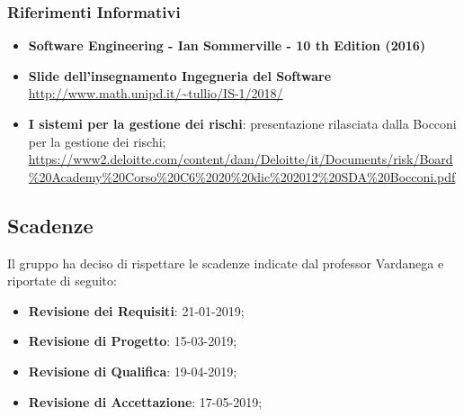 		\subsubsection{Riferimenti Informativi}
			\begin{itemize}
				\item \textbf{Software Engineering - Ian Sommerville - 10 th Edition (2016)}
				\item \textbf{Slide dell’insegnamento Ingegneria del Software}\\
				\url{http://www.math.unipd.it/~tullio/IS-1/2018/}
				\item \textbf{I sistemi per la gestione dei rischi}: presentazione rilasciata dalla Bocconi per la gestione dei rischi;\\
				\url{https://www2.deloitte.com/content/dam/Deloitte/it/Documents/risk/Board\%20Academy\%20Corso\%20C6\%2020\%20dic\%202012\%20SDA\%20Bocconi.pdf}
			\end{itemize}
		
	\subsection{Scadenze}
	Il gruppo ha deciso di rispettare le scadenze indicate dal professor Vardanega e riportate di seguito:
	\begin{itemize}
		\item \textbf{Revisione dei Requisiti}: 21-01-2019;
		\item \textbf{Revisione di Progetto}: 15-03-2019;
		\item \textbf{Revisione di Qualifica}: 19-04-2019;
		\item \textbf{Revisione di Accettazione}: 17-05-2019;
	\end{itemize}
	
